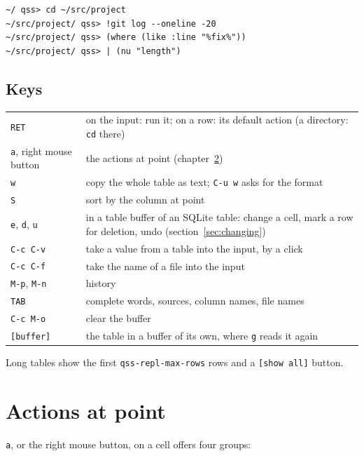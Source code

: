 \documentclass[
  paper=a4, fontsize=11pt, parskip=half, headings=small,
  toc=bibliography, numbers=noenddot, DIV=12
]{scrreprt}
\newcommand{\code}[1]{\texttt{#1}}
\newcommand{\kbd}[1]{\texttt{#1}}
\begin{document}
\begin{Verbatim}
~/ qss> cd ~/src/project
~/src/project/ qss> !git log --oneline -20
~/src/project/ qss> (where (like :line "%fix%"))
~/src/project/ qss> | (nu "length")
\end{Verbatim}

\section{Keys}

\noindent\begin{tabularx}{\linewidth}{@{}lX@{}}
\toprule
\kbd{RET} & on the input: run it; on a row: its default action (a directory: \code{cd} there) \\
\kbd{a}, right mouse button & the actions at point (chapter~\ref{chap:actions}) \\
\kbd{w} & copy the whole table as text; \kbd{C-u w} asks for the format \\
\kbd{S} & sort by the column at point \\
\kbd{e}, \kbd{d}, \kbd{u} & in a table buffer of an SQLite table: change a cell, mark a row for deletion, undo (section~\ref{sec:changing}) \\
\kbd{C-c C-v} & take a value from a table into the input, by a click \\
\kbd{C-c C-f} & take the name of a file into the input \\
\kbd{M-p}, \kbd{M-n} & history \\
\kbd{TAB} & complete words, sources, column names, file names \\
\kbd{C-c M-o} & clear the buffer \\
\code{[buffer]} & the table in a buffer of its own, where \kbd{g} reads it again \\
\bottomrule
\end{tabularx}

Long tables show the first \code{qss-repl-max-rows} rows and a
\code{[show all]} button.

\chapter{Actions at point}\label{chap:actions}

\kbd{a}, or the right mouse button, on a cell offers four groups:
\end{document}

